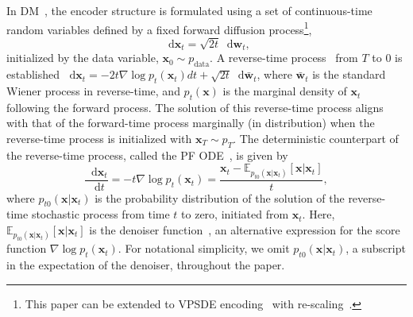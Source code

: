 \documentclass{article} \usepackage{iclr2024_coNFErence,times}
\theoremstyle{definition}
\theoremstyle{remark}
\newcommand*\diff{\mathop{}\!\mathrm{d}}
\begin{document}
In DM~\citep{sohl2015deep,song2020score}, the encoder structure is formulated using a set of continuous-time random variables defined by a fixed forward diffusion process\footnote{This paper can be extended to VPSDE encoding~\citep{song2020score} with re-scaling~\citep{kim2022refining}.}, 
\begin{equation*}\label{eq:sde_forward}
    \diff\mathbf{x}_t =  \sqrt{2t} \diff\mathbf{w}_t,
\end{equation*}
initialized by the data variable, $\mathbf{x}_{0}\sim p_{\text{data}}$. A reverse-time process~\citep{anderson1982reverse} from $T$ to $0$ is established 
    $\diff\mathbf{x}_t =  - 2t \nabla\log p_t(\mathbf{x}_t)  dt + \sqrt{2t} \diff\bar{\mathbf{w}}_t$,
where $\bar{\mathbf{w}}_t$ is the standard Wiener process in reverse-time, and $p_t(\mathbf{x})$ is the marginal density of $\mathbf{x}_t$ following the forward process. The solution of this reverse-time process aligns with that of the forward-time process marginally (in distribution) when the reverse-time process is  initialized with $\mathbf{x}_{T}\sim p_{T}$. The deterministic counterpart of the reverse-time process, called the PF ODE~\cite{song2020score}, is given by \begin{equation*}\frac{\diff \mathbf{x}_t}{\diff t} =  -t \nabla \log p_t (\mathbf{x}_t)=\frac{\mathbf{x}_{t}-\mathbb{E}_{p_{t0}(\mathbf{x}\vert\mathbf{x}_{t})}[\mathbf{x}\vert\mathbf{x}_{t}]}{t},
\end{equation*}
where $p_{t0}(\mathbf{x}\vert\mathbf{x}_{t})$ is the probability distribution of the solution of the reverse-time stochastic process from time $t$ to zero, initiated from $\mathbf{x}_{t}$. Here, $\mathbb{E}_{p_{t0}(\mathbf{x}\vert\mathbf{x}_{t})}[\mathbf{x}\vert\mathbf{x}_{t}]$ is the denoiser function~\citep{efron2011tweedie}, 
an alternative expression for the score function $\nabla\log{p_{t}(\mathbf{x}_{t})}$. For notational simplicity, we omit $p_{t0}(\mathbf{x}\vert\mathbf{x}_{t})$, a subscript in the expectation of the denoiser, throughout the paper. 
\end{document}

